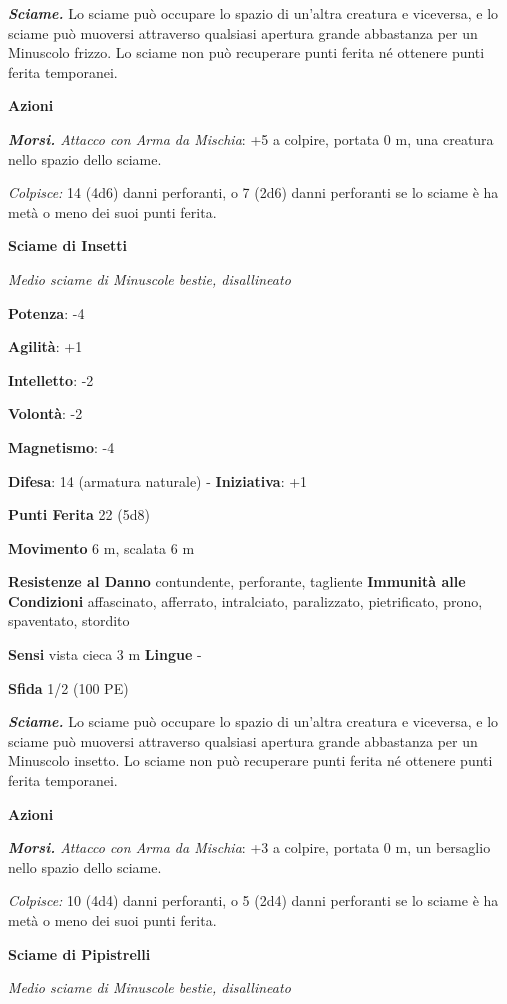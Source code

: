 \begin{multicols}{2}
\emph{\textbf{Sciame.}} Lo sciame può occupare lo spazio di un'altra
creatura e viceversa, e lo sciame può muoversi attraverso qualsiasi
apertura grande abbastanza per un Minuscolo frizzo. Lo sciame non può
recuperare punti ferita né ottenere punti ferita temporanei.

\textbf{Azioni}

\emph{\textbf{Morsi.} Attacco con Arma da Mischia}: +5 a colpire,
portata 0 m, una creatura nello spazio dello sciame.

\emph{Colpisce:} 14 (4d6) danni perforanti, o 7 (2d6) danni perforanti
se lo sciame è ha metà o meno dei suoi punti ferita.

\textbf{Sciame di Insetti}

\emph{Medio sciame di Minuscole bestie, disallineato}

\textbf{Potenza}: -4

\textbf{Agilità}: +1

\textbf{Intelletto}: -2

\textbf{Volontà}: -2

\textbf{Magnetismo}: -4

\textbf{Difesa}: 14 (armatura naturale) - \textbf{Iniziativa}: +1

\textbf{Punti Ferita} 22 (5d8)

\textbf{Movimento} 6 m, scalata 6 m

\textbf{Resistenze al Danno} contundente, perforante, tagliente
\textbf{Immunità alle Condizioni} affascinato, afferrato, intralciato,
paralizzato, pietrificato, prono, spaventato, stordito

\textbf{Sensi} vista cieca 3 m \textbf{Lingue} -

\textbf{Sfida} 1/2 (100 PE)

\emph{\textbf{Sciame.}} Lo sciame può occupare lo spazio di un'altra
creatura e viceversa, e lo sciame può muoversi attraverso qualsiasi
apertura grande abbastanza per un Minuscolo insetto. Lo sciame non può
recuperare punti ferita né ottenere punti ferita temporanei.

\textbf{Azioni}

\emph{\textbf{Morsi.} Attacco con Arma da Mischia}: +3 a colpire,
portata 0 m, un bersaglio nello spazio dello sciame.

\emph{Colpisce:} 10 (4d4) danni perforanti, o 5 (2d4) danni perforanti
se lo sciame è ha metà o meno dei suoi punti ferita.

\textbf{Sciame di Pipistrelli}

\emph{Medio sciame di Minuscole bestie, disallineato}


\end{multicols}
